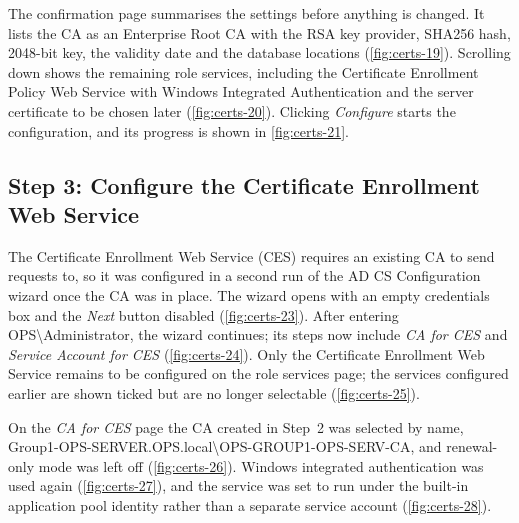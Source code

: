 
The confirmation page summarises the settings before anything is changed. It lists the CA as an Enterprise Root CA with the RSA key provider, SHA256 hash, 2048-bit key, the validity date and the database locations (\autoref{fig:certs-19}). Scrolling down shows the remaining role services, including the Certificate Enrollment Policy Web Service with Windows Integrated Authentication and the server certificate to be chosen later (\autoref{fig:certs-20}). Clicking \emph{Configure} starts the configuration, and its progress is shown in \autoref{fig:certs-21}.


\subsection{Step 3: Configure the Certificate Enrollment Web Service}
\label{sec:certs-step3}
The Certificate Enrollment Web Service (CES) requires an existing CA to send requests to, so it was configured in a second run of the AD CS Configuration wizard once the CA was in place. The wizard opens with an empty credentials box and the \emph{Next} button disabled (\autoref{fig:certs-23}). After entering OPS\textbackslash Administrator, the wizard continues; its steps now include \emph{CA for CES} and \emph{Service Account for CES} (\autoref{fig:certs-24}). Only the Certificate Enrollment Web Service remains to be configured on the role services page; the services configured earlier are shown ticked but are no longer selectable (\autoref{fig:certs-25}).


On the \emph{CA for CES} page the CA created in Step~2 was selected by name, Group1-OPS-SERVER.OPS.local\textbackslash OPS-GROUP1-OPS-SERV-CA, and renewal-only mode was left off (\autoref{fig:certs-26}). Windows integrated authentication was used again (\autoref{fig:certs-27}), and the service was set to run under the built-in application pool identity rather than a separate service account (\autoref{fig:certs-28}).

